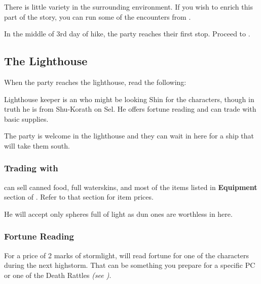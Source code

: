There is little variety in the surrounding environment. If you wish to enrich this part of the story, you can run some of the encounters from .

In the middle of 3rd day of hike, the party reaches their first stop. Proceed to .




\subsection{The Lighthouse}
\label{ssec:shadesmarLighthouse}

When the party reaches the lighthouse, read the following:


Lighthouse keeper \npcFortuneReader[s]{} is an \enemyExpert{} who might be looking Shin for the characters, though in truth he is from Shu-Korath on Sel. He offers fortune reading and can trade with basic supplies.

The party is welcome in the lighthouse and they can wait in here for a ship that will take them south.



\subsubsection{Trading with \npcFortuneReader{}}

\npcFortuneReader{} can sell canned food, full waterskins, and most of the items listed in \textbf{Equipment} section of \handbook{}. Refer to that section for item prices.

He will accept only spheres full of light as dun ones are worthless in here.


\subsubsection{Fortune Reading}

For a price of 2 marks of stormlight, \npcFortuneReader{} will read fortune for one of the characters during the next highstorm. That can be something you prepare for a specific PC or one of the Death Rattles \textit{(see )}.

